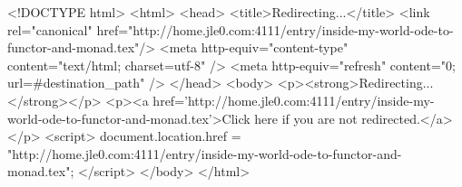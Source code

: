 <!DOCTYPE html>
<html>
<head>
<title>Redirecting...</title>
<link rel="canonical" href="http://home.jle0.com:4111/entry/inside-my-world-ode-to-functor-and-monad.tex"/>
<meta http-equiv="content-type" content="text/html; charset=utf-8" />
<meta http-equiv="refresh" content="0; url=#{destination_path}" />
</head>
<body>
  <p><strong>Redirecting...</strong></p>
  <p><a href='http://home.jle0.com:4111/entry/inside-my-world-ode-to-functor-and-monad.tex'>Click here if you are not redirected.</a></p>
  <script>
    document.location.href = "http://home.jle0.com:4111/entry/inside-my-world-ode-to-functor-and-monad.tex";
  </script>
</body>
</html>
